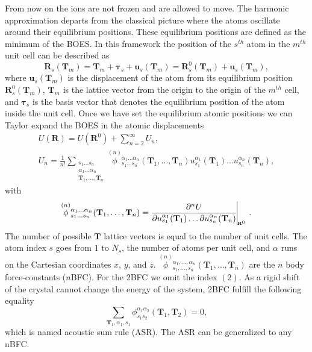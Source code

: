 From now on the ions are not frozen and are allowed to move. The harmonic approximation departs from the classical picture where the atoms oscillate around their equilibrium positions. These equilibrium positions are defined as 
the minimum of the BOES. In this framework the position of the $s^{th}$ atom in the $m^{th}$ unit cell can be described as
\begin{equation}
 \mathbf{R}_{s}(\mathbf{T}_{m})=\mathbf{T}_{m}+\boldsymbol{\tau}_{s}+\mathbf{u}_{s}(\mathbf{T}_{m})=\mathbf{R}_{s}^{0}(\mathbf{T}_{m})+\mathbf{u}_{s}(\mathbf{T}_{m}),
\end{equation}  
where $\mathbf{u}_{s}(\mathbf{T}_{m})$ is the displacement of the atom from its equilibrium position $\mathbf{R}_{s}^{0}(\mathbf{T}_{m})$, $\mathbf{T}_{m}$ is the lattice vector from the origin to the origin of the $m^{th}$ 
cell, and $\boldsymbol{\tau}_{s}$ is the basis vector that denotes the equilibrium position of the atom inside the unit cell. Once we have set the equilibrium atomic positions we can Taylor expand the BOES in the atomic displacements
\begin{multline}
 \label{taylor-expansion}
 U(\mathbf{R})=U(\mathbf{R}^{0})+\sum_{n=2}^{\infty}U_{n}, \\ U_{n}=\frac{1}{n!}\sum\limits_{\substack{s_{1}\dots s_{n} \\ \alpha_{1}\dots\alpha_{n} \\ \mathbf{T}_{1},\dots,\mathbf{T}_{n}}} 
 \overset{(n)}{\phi}{}_{s_{1}\dots s_{n}}^{\alpha_{1}\dots\alpha_{n}}(\mathbf{T}_{1},\dots,\mathbf{T}_{n})u_{s_{1}}^{\alpha_{1}}(\mathbf{T}_{1})\dots u_{s_{n}}^{\alpha_{n}}(\mathbf{T}_{n}),
\end{multline}
with
\begin{equation}
 \label{perturbative-nbfc}
 \overset{(n)}{\phi}{}_{s_{1}\dots s_{n}}^{\alpha_{1}\dots\alpha_{n}}(\mathbf{T}_{1},\dots,\mathbf{T}_{n})=\frac{\partial^{n}U}{\partial u_{s_{1}}^{\alpha_{1}}(\mathbf{T}_{1})\dots\partial u_{s_{n}}^{
 \alpha_{n}}(\mathbf{T}_{n})}\vline_{_{_{_{_{_{_{_{_{\mathbf{R}^{0}}}}}}}}}}.
\end{equation}
The number of possible $\mathbf{T}$ lattice vectors is equal to the number of unit cells. The atom index $s$ goes from $1$ to $N_{s}$, the number of atoms per unit cell, and $\alpha$ runs on the Cartesian coordinates $x$, $y$, and 
$z$. $\overset{(n)}{\phi}{}_{s_{1},\dots,s_{n}}^{\alpha_{1},\dots,\alpha_{n}}(\mathbf{T}_{1},\dots,\mathbf{T}_{n})$ 
are the $n$ body force-constants ($n$BFC). For the 2BFC we omit the index $(2)$. As a rigid shift of the crystal 
cannot change the energy of the system, 2BFC fulfill the following equality
\begin{equation}
\label{acoustic-sum-rule}
\sum_{\mathbf{T}_{1},\alpha_{1},s_{1}}\phi_{s_{1}s_{2}}^{\alpha_{1}\alpha_{2}}(\mathbf{T}_{1},\mathbf{T}_{2})=0,
\end{equation}
which is named acoustic sum rule (ASR). The ASR can be generalized to any nBFC. \\

